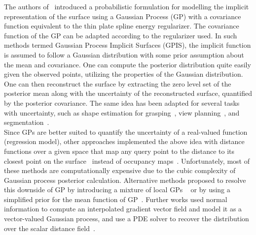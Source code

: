The authors of~\cite{GPIS} introduced a probabilistic formulation for modelling the implicit representation of the surface using a Gaussian Process (GP) with a covariance function equivalent to the thin plate spline energy regularizer. The covariance function of the GP can be adapted according to the regularizer used. In such methods termed Gaussian Process Implicit Surfaces (GPIS), the implicit function is assumed to follow a Gaussian distribution with some prior assumption about the mean and covariance. One can compute the posterior distribution quite easily given the observed points, utilizing the properties of the Gaussian distribution. One can then reconstruct the surface by extracting the zero level set of the posterior mean along with the uncertainty of the reconstructed surface, quantified by the posterior covariance. The same idea has been adapted for several tasks with uncertainty, such as shape estimation for grasping~\cite{GPISGrasp}, view planning~\cite{GPISView}, and segmentation~\cite{GPRSeg}. 
\\
Since GPs are better suited to quantify the uncertainty of a real-valued function (regression model), other approaches implemented the above idea with distance functions over a given space that map any query point to the distance to its closest point on the surface~\cite{logGPIS, geoPriorGPIS, GPDF, onlineGPIS, onlinePriorGPIS} instead of occupancy maps~\cite{GPOccMap}. Unfortunately, most of these methods are computationally expensive due to the cubic complexity of Gaussian process posterior calculation. Alternative methods proposed to resolve this downside of GP by introducing a mixture of local GPs ~\cite{mixGPOccMap, locGPOccMap, onlineGPIS} or by using a simplified prior for the mean function of GP~\cite{onlinePriorGPIS, GMMGP}. Further works used normal information to compute an interpolated gradient vector field and model it as a vector-valued Gaussian process, and use a PDE solver to recover the distribution over the scalar distance field~\cite{SPSR, NeuralSPSR}.
\newline

